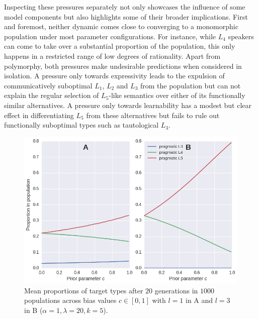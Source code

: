 \documentclass[a4paper]{article}
\begin{document}
Inspecting these pressures separately not only showcases the influence of some model components but also highlights some of their broader implications. First and foremost, neither dynamic comes close to converging to a monomorphic population under most parameter configurations. For instance, while $L_4$ speakers can come to take over a substantial proportion of the population, this only happens in a restricted range of low degrees of rationality. Apart from polymorphy, both pressures make undesirable predictions when considered in isolation. A pressure only towards expressivity leads to the expulsion of communicatively suboptimal $L_1$, $L_2$ and $L_3$ from the population but can not explain the regular selection of $L_5$-like semantics over either of its functionally similar alternatives. A pressure only towards learnability has a modest but clear effect in differentiating $L_5$ from these alternatives but fails to rule out functionally suboptimal types such as tautological $L_3$. 

\begin{figure}
\centering
\includegraphics[scale=.5]{./fig2-rmd}
\caption{Mean proportions of target types after $20$ generations in $1000$ populations across bias values $c \in [0,1]$ with $l =1$ in A and $l = 3$ in B ($\alpha =1, \lambda = 20, k = 5$).}
\label{fig:cost}
\end{figure}
\end{document}
